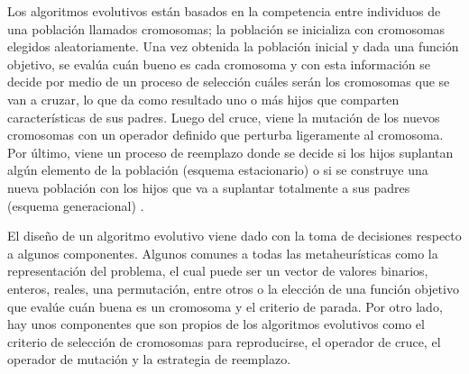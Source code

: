 Los algoritmos evolutivos están basados en la competencia entre individuos de una población llamados cromosomas; la población se inicializa con cromosomas elegidos aleatoriamente. Una vez obtenida la población inicial y dada una función objetivo, se evalúa cuán bueno es cada cromosoma y con esta información se decide por medio de un proceso de selección cuáles serán los cromosomas que se van a cruzar, lo que da como resultado uno o más hijos que comparten características de sus padres. Luego del cruce, viene la mutación de los nuevos cromosomas con un operador definido que perturba ligeramente al cromosoma. Por último, viene un proceso de reemplazo donde se decide si los hijos suplantan algún elemento de la población (esquema estacionario) o si se construye una nueva población con los hijos que va a suplantar totalmente a sus padres (esquema generacional) \cite{talbi2009metaheuristics}. 

El diseño de un algoritmo evolutivo viene dado con la toma de decisiones respecto a algunos componentes. Algunos comunes a todas las metaheurísticas como la representación del problema, el cual puede ser un vector de valores binarios, enteros, reales, una permutación, entre otros o la elección de una función objetivo que evalúe cuán buena es un cromosoma y el criterio de parada. Por otro lado, hay unos componentes que son propios de los algoritmos evolutivos como el criterio de selección de cromosomas para reproducirse, el operador de cruce, el operador de mutación y la estrategia de reemplazo.


